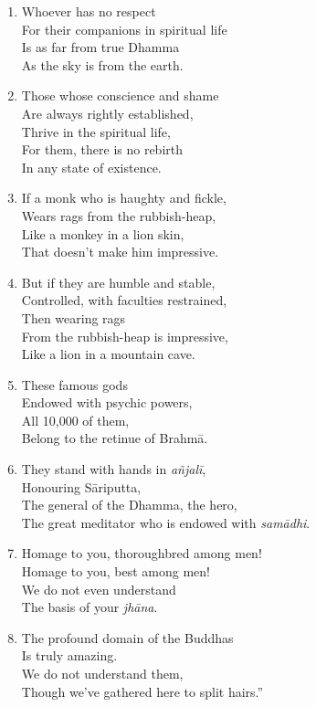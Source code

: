 \documentclass[10pt, openany]{book}
\newcommand*{\vleftofline}[1]{\leavevmode\llap{#1}}
\begin{document}
\begin{enumerate}
\item Whoever has no respect\\
For their companions in spiritual life\\
Is as far from true Dhamma\\
As the sky is from the earth.

\item Those whose conscience and shame\\
Are always rightly established,\\
Thrive in the spiritual life,\\
For them, there is no rebirth \\
In any state of existence.

\item If a monk who is haughty and fickle,\\
Wears rags from the rubbish-heap,\\
Like a monkey in a lion skin,\\
That doesn’t make him impressive.

\item But if they are humble and stable,\\
Controlled, with faculties restrained,\\
Then wearing rags \\
From the rubbish-heap is impressive,\\
Like a lion in a mountain cave.

\item These famous gods\\
Endowed with psychic powers,\\
All 10,000 of them,\\
Belong to the retinue of Brahmā.

\item They stand with hands in \emph{añjalī},\\
Honouring Sāriputta,\\
The general of the Dhamma, the hero,\\
The great meditator who is endowed with \emph{samādhi}.

\item \vleftofline{“}Homage to you, thoroughbred among men!\\
Homage to you, best among men!\\
We do not even understand\\
The basis of your \emph{jhāna}.

\item The profound domain of the Buddhas\\
Is truly amazing.\\
We do not understand them,\\
Though we’ve gathered here to split hairs.”


\end{enumerate}
\end{document}

